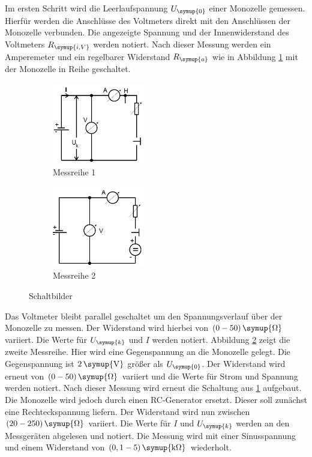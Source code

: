 Im ersten Schritt wird die Leerlaufspannung $U_\symup{0}$ einer Monozelle
gemessen. Hierfür werden die Anschlüsse des Voltmeters direkt mit den Anschlüssen
der Monozelle verbunden. Die angezeigte Spannung und der Innenwiderstand des
Voltmeters $R_\symup{i,V}$ werden notiert.
Nach dieser Messung werden ein Amperemeter und ein regelbarer Widerstand
$R_\symup{a}$ wie in Abbildung \ref{fig:schlt1} mit der Monozelle in Reihe geschaltet.
\begin{figure}[H]
  \centering
  \begin{subfigure}{0.48\textwidth}
    \centering
    \includegraphics[width=4cm]{bilder/sinrecht.jpg}
    \caption{Messreihe 1}
    \label{fig:schlt1}
  \end{subfigure}
  \begin{subfigure}{0.48\textwidth}
    \centering
    \includegraphics[width=4cm]{bilder/gegenspannung.jpg}
    \caption{Messreihe 2}
    \label{fig:schlt2}
  \end{subfigure}
  \caption{Schaltbilder \cite{301}}
  \label{fig:schlt}
\end{figure}
Das Voltmeter bleibt parallel geschaltet um den Spannungsverlauf über der
Monozelle zu messen. Der Widerstand wird hierbei von $(0-50)\,\symup{\si{\ohm}}$
variiert. Die Werte für $U_\symup{k}$ und $I$ werden notiert.
Abbildung \ref{fig:schlt2} zeigt die zweite Messreihe. Hier wird eine
Gegenspannung an die Monozelle gelegt. Die Gegenspannung ist $2\,\symup{\si{\volt}}$
größer als $U_\symup{0}$. Der Widerstand wird erneut von $(0-50)\,\symup{\si{\ohm}}$
variiert und die Werte für Strom und Spannung werden notiert.
Nach dieser Messung wird erneut die Schaltung aus \ref{fig:schlt1} aufgebaut.
Die Monozelle wird jedoch durch einen RC-Generator ersetzt. Dieser soll zunächst
eine Rechteckspannung liefern. Der Widerstand wird nun zwischen $(20-250)\,\symup{\si{\ohm}}$
variiert. Die Werte für $I$ und $U_\symup{k}$ werden an den Messgeräten
abgelesen und notiert.
Die Messung wird mit einer Sinusspannung und einem Widerstand von
$(0,1-5)\,\symup{\si{\kilo\ohm}}$ wiederholt.
